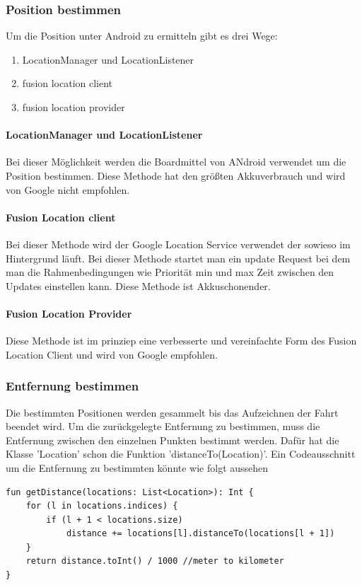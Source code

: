\documentclass[a4paper]{article}
\begin{document}
\subsubsection{Position bestimmen}
Um die Position unter Android zu ermitteln gibt es drei Wege:
\begin{enumerate}
	\item  LocationManager und LocationListener
	\item fusion location client
	\item fusion location provider
\end{enumerate}

\paragraph{LocationManager und LocationListener}
Bei dieser Möglichkeit werden die Boardmittel von ANdroid verwendet um die Position bestimmen.
Diese Methode hat den größten Akkuverbrauch und wird von Google nicht empfohlen.

\paragraph{Fusion Location client}
Bei dieser Methode wird der Google Location Service verwendet der sowieso im Hintergrund läuft. Bei dieser Methode 
startet man ein update Request bei dem man die Rahmenbedingungen wie Priorität min und max Zeit zwischen den Updates einstellen kann.
Diese Methode ist Akkuschonender.

\paragraph{Fusion Location Provider}
Diese Methode ist im prinziep eine verbesserte und vereinfachte Form des Fusion Location Client und wird von Google empfohlen.

\subsubsection{Entfernung bestimmen}
Die bestimmten Positionen werden gesammelt bis das Aufzeichnen der Fahrt beendet wird. 
Um die zurückgelegte Entfernung zu bestimmen, muss die Entfernung zwischen den einzelnen Punkten bestimmt werden.
Dafür hat die Klasse 'Location' schon die Funktion 'distanceTo(Location)'.
Ein Codeausschnitt um die Entfernung zu bestimmten könnte wie folgt aussehen

\begin{verbatim}
fun getDistance(locations: List<Location>): Int {
	for (l in locations.indices) {
		if (l + 1 < locations.size)
			distance += locations[l].distanceTo(locations[l + 1])
	}
	return distance.toInt() / 1000 //meter to kilometer
}
\end{verbatim}
\end{document}
